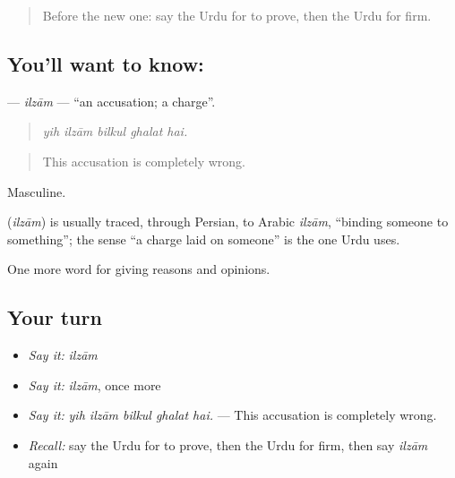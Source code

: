 \begin{quote}
Before the new one: say the Urdu for to prove, then the Urdu for firm.
\end{quote}

\subsection*{You'll want to know: }
\textbf{} — \emph{ilzām} — \textquotedblleft{}an accusation; a charge\textquotedblright{}.

\begin{quote}
    
\end{quote}

\begin{quote}
\emph{yih ilzām bilkul ghalat hai.}
\end{quote}

\begin{quote}
This accusation is completely wrong.
\end{quote}

Masculine.

\begin{cousinweb}
\textbf{} (\emph{ilzām}) is usually traced, through Persian, to Arabic \emph{ilzām}, \textquotedblleft{}binding someone to something\textquotedblright{}; the sense \textquotedblleft{}a charge laid on someone\textquotedblright{} is the one Urdu uses.
\end{cousinweb}

\begin{grammarlens}[title={What you've built}]
One more word for giving reasons and opinions.
\end{grammarlens}

\subsection*{Your turn}
\begin{itemize}
\raggedright
  \item \emph{Say it:} \emph{ilzām}
  \item \emph{Say it:} \emph{ilzām}, once more
  \item \emph{Say it:} \emph{yih ilzām bilkul ghalat hai.} — This accusation is completely wrong.
  \item \emph{Recall:} say the Urdu for to prove, then the Urdu for firm, then say \emph{ilzām} again
\end{itemize}

